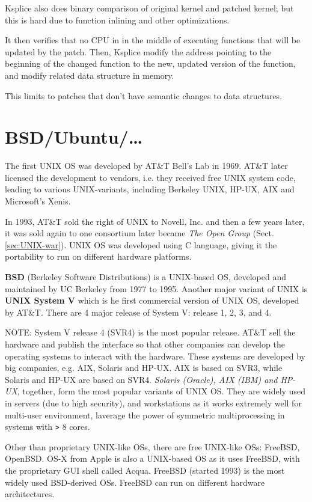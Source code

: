 Ksplice also does binary comparison of original kernel and patched kernel; but
this is hard due to function inlining and other optimizations.

It then verifies that no CPU in in the middle of executing functions that will be updated by the patch. Then, Ksplice
modify the address pointing to the beginning of the changed function to the new,
updated version of the function, and modify related data structure in memory.

This limits to patches that don't have semantic changes to data structures.

\section{BSD/Ubuntu/\ldots}

The first UNIX OS was developed by AT\&T Bell's Lab in 1969. AT\&T later
licensed the development to vendors, i.e. they received free UNIX system code,
leading to various UNIX-variants, including Berkeley UNIX, HP-UX, AIX and
Microsoft's Xenis. 

In 1993, AT\&T sold the right of UNIX to Novell, Inc. and then a few years
later, it was sold again to one consortium later became {\it The Open Group}
(Sect.\ref{sec:UNIX-war}). UNIX OS was developed using C language, giving it
the portability to run on different hardware platforms.

{\bf BSD} (Berkeley Software Distributions) is a UNIX-based OS, developed and
maintained by UC Berkeley from 1977 to 1995. Another major variant of UNIX is
{\bf UNIX System V} which is he first commercial version of UNIX OS, developed
by AT\&T. There are 4 major release of System V: release 1, 2, 3, and 4. 

NOTE: System V release 4 (SVR4) is the most popular release. AT\&T sell the
hardware and publish the interface so that other companies can develop the
operating systems to interact with the hardware. These systems are developed by
big companies, e.g. AIX, Solaris and HP-UX. AIX is based on SVR3, while Solaris
and HP-UX are based on SVR4. {\it Solaris (Oracle), AIX (IBM) and HP-UX},
together, form the most popular variants of UNIX OS. They are widely used in
servers (due to high security), and workstations as it works extremely well for
multi-user environment, laverage the power of symmetric multiprocessing in
systems with \verb!>! 8 cores.

Other than proprietary UNIX-like OSs, there are free UNIX-like OSs: FreeBSD,
OpenBSD. OS-X from Apple is also a UNIX-based OS as it uses FreeBSD, with the
proprietary GUI shell called Acqua. FreeBSD (started 1993) is the most widely
used BSD-derived OSs. FreeBSD can run on different hardware architectures.

